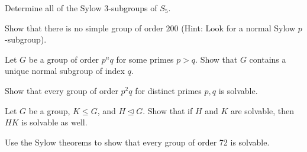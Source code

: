 \documentclass{problemset}
\begin{document}
\begin{exercise} Determine all of the Sylow \(3\)-subgroups of \(S_5\).
\end{exercise}


\begin{exercise} Show that there is no simple group of order \(200\) (Hint: Look for a normal Sylow \(p\)-subgroup).
\end{exercise}


\begin{exercise} 
Let \(G\) be a group of order \(p^nq\) for some primes \(p>q\). Show that \(G\) contains a unique normal subgroup of index \(q\).
\end{exercise}


\begin{exercise} Show that every group of order \(p^2q\) for distinct primes \(p,q\) is solvable.
\end{exercise}


\begin{exercise} 
Let \(G\) be a group, \(K \leq G\), and \(H \unlhd G\).  Show that if \(H\) and \(K\) are solvable, then \(HK\) is solvable as well.
\end{exercise}


\begin{exercise} 
Use the Sylow theorems to show that every group of order 72 is solvable.  
\end{exercise}




\end{document}
